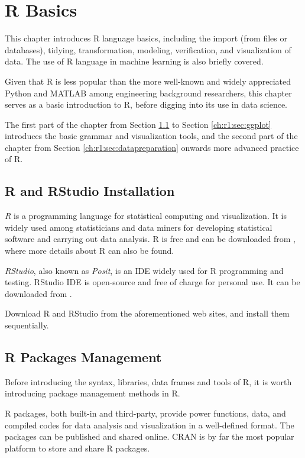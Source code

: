 \chapter{R Basics} \label{ch:r1}

This chapter introduces R language basics, including the import (from files or databases), tidying, transformation, modeling, verification, and visualization of data. The use of R language in machine learning is also briefly covered.

Given that R is less popular than the more well-known and widely appreciated Python and MATLAB among engineering background researchers, this chapter serves as a basic introduction to R, before digging into its use in data science.

The first part of the chapter from Section \ref{ch:r1:sec:rinstallation} to Section \ref{ch:r1:sec:ggplot} introduces the basic grammar and visualization tools, and the second part of the chapter from Section \ref{ch:r1:sec:datapreparation} onwards more advanced practice of R.

\section{R and RStudio Installation} \label{ch:r1:sec:rinstallation}

\textit{R} is a programming language for statistical computing and visualization. It is widely used among statisticians and data miners for developing statistical software and carrying out data analysis. R is free and can be downloaded from \cite{r}, where more details about R can also be found.

\textit{RStudio}, also known as \textit{Posit}, is an IDE widely used for R programming and testing. RStudio IDE is open-source and free of charge for personal use. It can be downloaded from \cite{rstudio}.

Download R and RStudio from the aforementioned web sites, and install them sequentially.

\section{R Packages Management} \label{ch:r1:sec:rpackage}

Before introducing the syntax, libraries, data frames and tools of R, it is worth introducing package management methods in R.

R packages, both built-in and third-party, provide power functions, data, and compiled codes for data analysis and visualization in a well-defined format. The packages can be published and shared online. CRAN is by far the most popular platform to store and share R packages.

